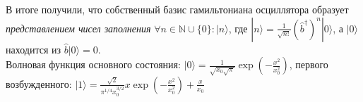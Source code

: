 \documentclass[__main__.tex]{subfiles}
\begin{document}
	В итоге получили, что собственный базис гамильтониана осциллятора образует \textit{представлением чисел заполнения} $\forall n\in\mathbb{N}\cup\{0\}\colon|n\rangle$, где $|n\rangle = \frac{1}{\sqrt{n!}}\left(\hat{b}^\dagger\right)^n|0\rangle$, а $|0\rangle$ находится из $\hat{b}|0\rangle = 0$.\\

	Волновая функция основного состояния: $|0\rangle = \frac{1}{\sqrt{x_0\sqrt{\pi}}}\exp\left(-\frac{x^2}{x_0^2}\right)$, первого возбужденного: $|1\rangle = \frac{\sqrt{2}}{\pi^{1/4}x_0^{3/2}}x\exp\left(-\frac{x^2}{x_0^2}\right) + \frac{x}{x_0}$
	
\end{document}
